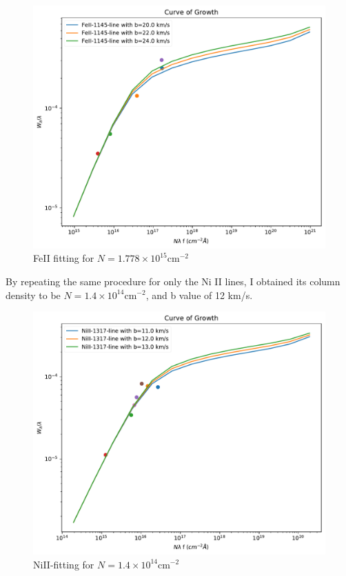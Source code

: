 \documentclass[12pt]{article}
\begin{document}
\begin{figure}[H]
	\centering
	\includegraphics[width=0.9\linewidth]{../FeII-fiting}
	\caption{FeII fitting for $N=1.778 \times 10^{15}$cm$^{-2}$}
	\label{fig:feii-fiting}
\end{figure}

\newpage

By repeating the same procedure for only the Ni II lines, I obtained its column density to be $N=1.4 \times 10^{14}$cm$^{-2}$, and b value of 12 km/s.

\begin{figure}[H]
	\centering
	\includegraphics[width=0.9\linewidth]{../NiII-fiting}
	\caption{NiII-fitting for $N=1.4 \times 10^{14}$cm$^{-2}$}
	\label{fig:niii-fiting}
\end{figure}
\end{document}
